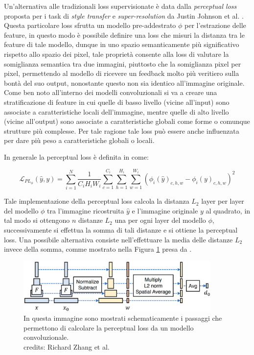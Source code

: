 Un'alternativa alle tradizionali loss supervisionate è data dalla \textit{perceptual loss} proposta per i task di \textit{style transfer}
e \textit{super-resolution} da Justin Johnson et al. \cite{johnson2016perceptual}. Questa particolare loss sfrutta un
modello pre-addestrato $\phi$ per l'estrazione delle feature, in questo modo è possibile definire una loss che misuri la distanza tra le feature
di tale modello, dunque in uno spazio semanticamente più significativo rispetto allo spazio dei pixel, tale proprietà consente alla loss di valutare
la somiglianza semantica tra due immagini, piuttosto che la somiglianza pixel per pixel, permettendo al modello di ricevere un feedback
molto più veritiero sulla bontà del suo output, nonostante questo non sia identico all'immagine originale.\\

Come ben noto all'interno dei modelli convoluzionali si va a creare una stratificazione di feature in cui quelle di basso livello (vicine all'input)
sono associate a caratteristiche locali dell'immagine, mentre quelle di alto livello (vicine all'output) sono associate a caratteristiche globali
come forme o comunque strutture più complesse. Per tale ragione tale loss può essere anche influenzata per dare più peso a caratteristiche globali o locali.

In generale la perceptual loss è definita in \cite{johnson2016perceptual} come:

\begin{equation}
    \mathcal{L}_{PL_\phi}(\hat{y}, y) = \sum_{i=1}^{N} \frac{1}{C_i H_i W_i} \sum_{c=1}^{C_i} \sum_{h=1}^{H_i} \sum_{w=1}^{W_i} \left( \phi_i(\hat{y})_{c,h,w} - \phi_i(y)_{c,h,w} \right)^2
\end{equation}

Tale implementazione della perceptual loss calcola la distanza $L_2$ layer per layer del modello $\phi$ tra l'immagine ricostruita $\hat{y}$ e l'immagine originale $y$ al quadrato,
in tal modo si ottengono $n$ distanze $L_2$ una per ogni layer del modello $\phi$, successivamente si effettua la somma di tali distanze e si ottiene 
la perceptual loss. Una possibile alternativa consiste nell'effettuare la media delle distanze $L_2$ invece della somma, comme mostrato nella
Figura \ref{fig:perceptual_loss} presa da \cite{zhang2018unreasonable}.\\

\begin{figure}[H]
    \centering
    \includegraphics[width=0.9\textwidth]{imgs/perceptual_loss.png}
    \caption{In questa immagine sono mostrati schematicamente i passaggi che permettono di calcolare la perceptual loss da un modello convoluzionale.\\
        credits: Richard Zhang et al. \cite{zhang2018unreasonable}}
    \label{fig:perceptual_loss}
\end{figure}

